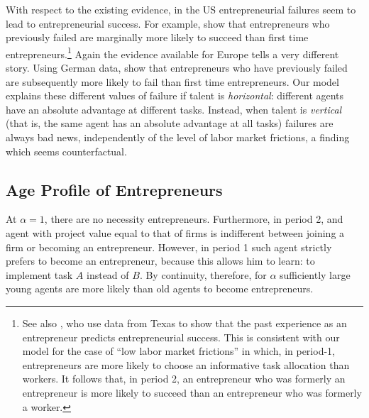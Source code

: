 \documentclass[12pt,american]{paper}
\theoremstyle{remark}
\begin{document}
With respect to the existing evidence, in the US entrepreneurial failures seem to lead to entrepreneurial success. For example, \citet*{gompers2010performance} show that entrepreneurs who previously failed are marginally more likely to succeed than first time entrepreneurs.\footnote{See also \cite{NBERw20312}, who use data from Texas to show that the past experience as an entrepreneur predicts entrepreneurial success. This is consistent with our model for the case of ``low labor market frictions'' in which, in period-1, entrepreneurs are more likely to choose an informative task allocation than workers. It follows that, in period 2, an entrepreneur who was formerly an entrepreneur is more likely to succeed than an entrepreneur who was formerly a worker.}
Again the evidence available for Europe tells a very different story.  
Using German data, \citet*{gottshalkGreene2012} show that entrepreneurs who have previously failed are subsequently more likely to fail than first time entrepreneurs. %
Our model explains these different values of failure if talent is \emph{horizontal}: different agents have  
an absolute advantage at different tasks.  Instead, when talent is \emph{vertical} (that is, the same agent has an absolute advantage at all tasks) failures are always bad news, independently of the level of labor market frictions, a finding which seems counterfactual. 

\subsection{Age Profile of Entrepreneurs}
At $\alpha=1$, there are no necessity entrepreneurs. Furthermore, in period 2, and agent with project value equal to that of firms is indifferent between joining a firm or becoming an entrepreneur. However, in period 1 such agent strictly prefers to become an entrepreneur, because this allows him to learn: to implement task $A$ instead of $B$. 
By continuity, therefore, for $\alpha$ sufficiently large young agents are more likely than old agents to become entrepreneurs.

\end{document}
